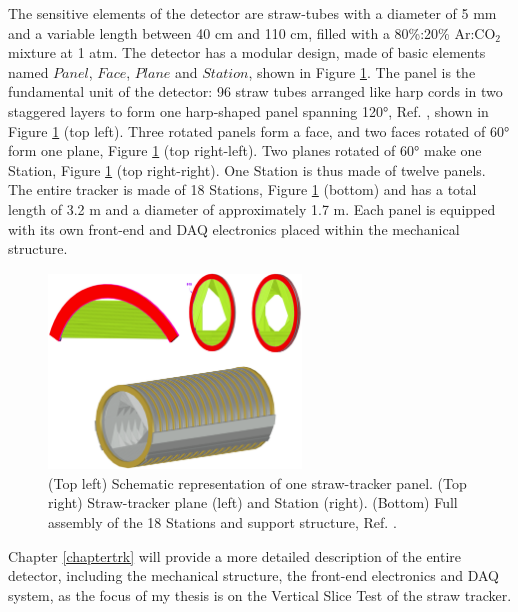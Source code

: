 The sensitive elements of the detector are straw-tubes with a diameter of 5 mm and a variable length between 40 cm and 110 cm, 
filled with a 80\%:20\% Ar:CO$_2$ mixture at 1 atm.  
The detector has a modular design, made of basic elements named $Panel$, $Face$, 
$Plane$ and $Station$, shown in Figure \ref{fig:trkpanel}. 
The panel is the fundamental unit of the detector: 96 straw tubes arranged like 
harp cords in two staggered layers to form one harp-shaped panel spanning 120°, Ref. \cite{bartoszek2015mu2e}, 
shown in Figure \ref{fig:trkpanel} (top left).
Three rotated panels form a face, and two faces rotated of 60° form one plane, Figure \ref{fig:trkpanel} (top right-left). 
Two planes rotated of 60° make one Station, Figure \ref{fig:trkpanel} (top right-right).
One Station is thus made of twelve panels. The entire tracker is made of 18 Stations, Figure \ref{fig:trkpanel} (bottom) 
and has a total length of 3.2 m and a diameter of approximately 1.7 m.
Each panel is equipped with its own front-end and DAQ electronics placed within the mechanical structure.
\begin{figure}[!h]
\centering
\includegraphics[width =0.6\textwidth]{figures/png/Screenshot_20240306_222803.png}
\caption{(Top left) Schematic representation of one straw-tracker panel. (Top right) 
Straw-tracker plane (left) and Station (right). (Bottom) Full assembly of the 18 
Stations and support structure, Ref. \cite{bartoszek2015mu2e}.}
\label{fig:trkpanel}
\end{figure}


Chapter \ref{chaptertrk} will provide a more detailed description of the entire detector, 
including the mechanical structure, the front-end electronics and DAQ system, as the focus of 
my thesis is on the Vertical Slice Test of the straw tracker.

